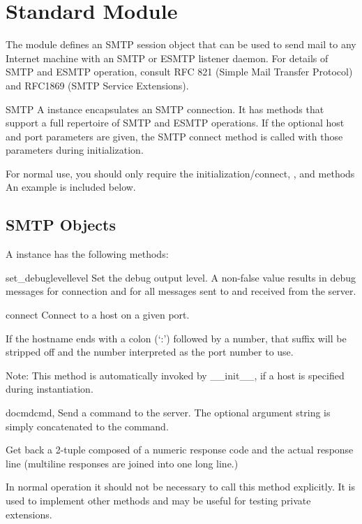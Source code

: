 \section{Standard Module }
\label{module-smtp}

The  module defines an SMTP session object that can be used
to send mail to any Internet machine with an SMTP or ESMTP listener daemon.
For details of SMTP and ESMTP operation, consult RFC 821 (Simple Mail
Transfer Protocol) and RFC1869 (SMTP Service Extensions).

\begin{classdesc}{SMTP}{}
A  instance encapsulates an SMTP connection.  It has
methods that support a full repertoire of SMTP and ESMTP
operations. If the optional host and port parameters are given, the
SMTP connect method is called with those parameters during
initialization.

For normal use, you should only require the initialization/connect,
, and  methods  An example is included below.
\end{classdesc}

\subsection{SMTP Objects}
\label{SMTP-objects}

A  instance has the following methods:

\begin{methoddesc}{set_debuglevel}{level}
Set the debug output level.  A non-false value results in debug
messages for connection and for all messages sent to and received from
the server.
\end{methoddesc}

\begin{methoddesc}{connect}{}
Connect to a host on a given port.

If the hostname ends with a colon (`:') followed by a number,
that suffix will be stripped off and the number interpreted as
the port number to use.

Note:  This method is automatically invoked by __init__,
if a host is specified during instantiation.
\end{methoddesc}

\begin{methoddesc}{docmd}{cmd, }
Send a command to the server.  The optional argument
string is simply concatenated to the command.

Get back a 2-tuple composed of a numeric response code and the actual
response line (multiline responses are joined into one long line.)

In normal operation it should not be necessary to call this method
explicitly.  It is used to implement other methods and may be useful
for testing private extensions.
\end{methoddesc}

